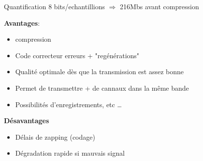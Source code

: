 			Quantification 8 bits/echantillions $\Rightarrow$ 216Mbs avant compression
			
			\textbf{Avantages}:
			\begin{itemize}
				\item compression
				\item Code correcteur erreurs + "regénérations"
				\item Qualité optimale dès que la transmission est assez bonne
				\item Permet de transmettre + de cannaux dans la même bande
				\item Possibilités d’enregistrements, etc \dots 
			\end{itemize}
			
			\textbf{Désavantages}
			\begin{itemize}
				\item Délais de zapping (codage)
				\item Dégradation rapide si mauvais signal
			\end{itemize}